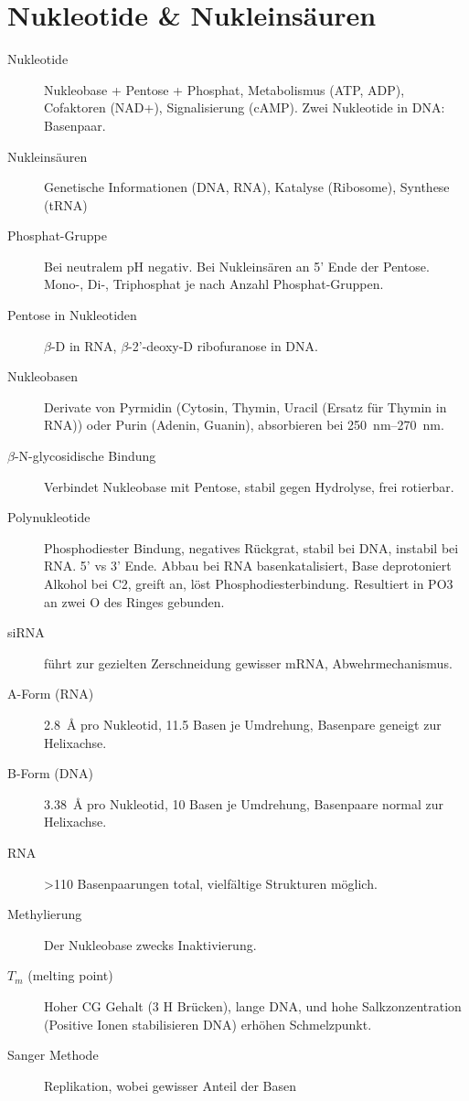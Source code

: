 \documentclass[a4paper,twocolumn,english,fontsize=7,DIV=16]{scrartcl}
\begin{document}
\section{Nukleotide \& Nukleinsäuren}

\begin{description}
	\item[Nukleotide] Nukleobase + Pentose + Phosphat, Metabolismus (ATP,
		ADP), Cofaktoren (NAD+), Signalisierung (cAMP). Zwei Nukleotide
		in DNA: Basenpaar.
	\item[Nukleinsäuren] Genetische Informationen (DNA, RNA), Katalyse (Ribosome), Synthese (tRNA)
	\item[Phosphat-Gruppe] Bei neutralem pH negativ. Bei Nukleinsären an 5'
		Ende der Pentose. Mono-, Di-, Triphosphat je nach Anzahl
		Phosphat-Gruppen.
	\item[Pentose in Nukleotiden] $\beta$-D in RNA, $\beta$-2'-deoxy-D
		ribofuranose in DNA.
	\item[Nukleobasen] Derivate von Pyrmidin (Cytosin, Thymin, Uracil
		(Ersatz für Thymin in RNA)) oder Purin (Adenin, Guanin),
		absorbieren bei
		\SIrange{250}{270}{\nm}.
	\item[$\beta$-N-glycosidische Bindung] Verbindet Nukleobase mit
		Pentose, stabil gegen Hydrolyse, frei rotierbar.
	\item[Polynukleotide] Phosphodiester Bindung, negatives Rückgrat,
		stabil bei DNA, instabil bei RNA. 5' vs 3' Ende. Abbau bei RNA
		basenkatalisiert, Base deprotoniert Alkohol bei C2, 
		greift  an, löst Phosphodiesterbindung. Resultiert in PO3
		an zwei O des Ringes gebunden.
	\item[siRNA] führt zur gezielten Zerschneidung gewisser mRNA,
		Abwehrmechanismus.
	\item[A-Form (RNA)] \SI{2.8}{\angstrom} pro Nukleotid, 11.5 Basen je
		Umdrehung, Basenpare geneigt zur Helixachse.
	\item[B-Form (DNA)] \SI{3.38}{\angstrom} pro Nukleotid, 10 Basen je
		Umdrehung, Basenpaare normal zur Helixachse.
	\item[RNA] >110 Basenpaarungen total, vielfältige Strukturen möglich.
	\item[Methylierung] Der Nukleobase zwecks Inaktivierung.
	\item[$T_m$ (melting point)] Hoher CG Gehalt (3 H Brücken), lange DNA,
		und hohe Salkzonzentration (Positive Ionen stabilisieren DNA)
		erhöhen Schmelzpunkt.
	\item[Sanger Methode] Replikation, wobei gewisser Anteil der Basen

\end{description}
\end{document}
